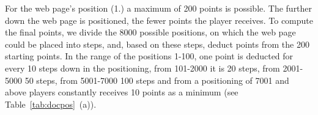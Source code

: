 \begin{table}[t]
\centering
    \caption{(a) Steps of the algorithm to compute points for the position of the target web page. (b) Example of the points calculation for the average position of found related documents.}
    \label{tab:docpos}
\qquad
{}
\end{table}
For the web page's position (1.) a maximum of 200 points is possible. The further down the web page is positioned, the fewer points the player receives. To compute the final points, we divide the 8000 possible positions, on which the web page could be placed into steps, and, based on these steps, deduct points from the 200 starting points. In the range of the positions \mbox{1-100}, one point is deducted for every 10 steps down in the positioning, from \mbox{101-2000} it is 20 steps, from \mbox{2001-5000} 50 steps, from \mbox{5001-7000} 100 steps and from a positioning of 7001 and above players constantly receives 10 points as a minimum (see Table~\ref{tab:docpos}~(a)).\par

